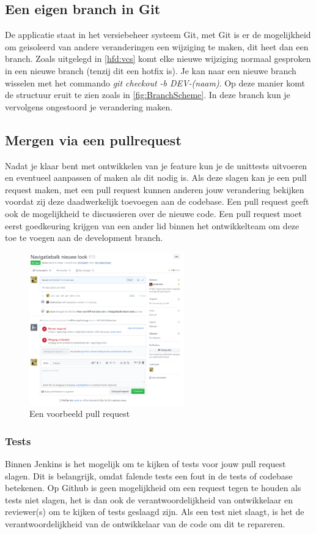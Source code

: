 \subsection{Een eigen branch in Git}
De applicatie staat in het versiebeheer systeem Git, met Git is er de mogelijkheid om geisoleerd van andere veranderingen een wijziging te maken, dit heet dan een branch. 
Zoals uitgelegd in \cref{hfd:vcs} komt elke nieuwe wijziging normaal gesproken in een nieuwe branch (tenzij dit een hotfix is).
Je kan naar een nieuwe branch wisselen met het commando \textit{git checkout -b DEV-(naam)}.
Op deze manier komt de structuur eruit te zien zoals in \cref{fig:BranchScheme}.
In deze branch kun je vervolgens ongestoord je verandering maken.
\clearpage
\subsection{Mergen via een pullrequest}
Nadat je klaar bent met ontwikkelen van je feature kun je de unittests uitvoeren en eventueel aanpassen of maken als dit nodig is.
Als deze slagen kan je een pull request maken, met een pull request kunnen anderen jouw verandering bekijken voordat zij deze daadwerkelijk toevoegen aan de codebase.
Een pull request geeft ook de mogelijkheid te discussieren over de nieuwe code.
Een pull request moet eerst goedkeuring krijgen van een ander lid binnen het ontwikkelteam om deze toe te voegen aan de development branch.
\begin{figure}[h]
	\centering\includegraphics[width=0.6\textwidth]{images/PullRequestExample.png}
	\caption{Een voorbeeld pull request}
\end{figure}

\subsubsection{Tests}
Binnen Jenkins is het mogelijk om te kijken of tests voor jouw pull request slagen.
Dit is belangrijk, omdat falende tests een fout in de tests of codebase betekenen.
Op Github is geen mogelijkheid om een request tegen te houden als tests niet slagen, het is dan ook de verantwoordelijkheid van ontwikkelaar en reviewer(s) om te kijken of tests geslaagd zijn.
Als een test niet slaagt, is het de verantwoordelijkheid van de ontwikkelaar van de code om dit te repareren.

